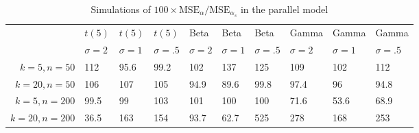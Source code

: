 \begin{table}[ht]
\centering
\caption{Simulations of $100 \times \textrm{MSE}_\alpha/\textrm{MSE}_{\alpha_s}$ in the parallel model} 
\label{tab:simulation}
\begin{tabular}{rlllllllll}
    & $t(5)$ & $t(5)$ & $t(5)$ & Beta & Beta & Beta & Gamma & Gamma & Gamma \\
  & $\sigma = 2$ & $\sigma = 1$ & $\sigma = .5$ & $\sigma = 2$ & $\sigma = 1$ & $\sigma = .5$ & $\sigma = 2$ & $\sigma = 1$ & $\sigma = .5$ \\
$k = 5, n = 50$ & 112 & 95.6 & 99.2 & 102 & 137 & 125 & 109 & 102 & 112 \\ 
  $k = 20, n = 50$ & 106 & 107 & 105 & 94.9 & 89.6 & 99.8 & 97.4 & 96 & 94.8 \\ 
  $k = 5, n = 200$ & 99.5 & 99 & 103 & 101 & 100 & 100 & 71.6 & 53.6 & 68.9 \\ 
  $k = 20, n = 200$ & 36.5 & 163 & 154 & 93.7 & 62.7 & 525 & 278 & 168 & 253 \\ 
  \end{tabular}
\end{table}
